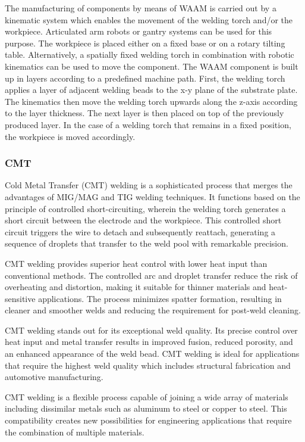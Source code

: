 The manufacturing of components by means of WAAM is carried out by a kinematic system which enables the movement of the welding torch and/or the workpiece. Articulated arm robots or gantry systems can be used for this purpose. The workpiece is placed either on a fixed base or on a rotary tilting table. Alternatively, a spatially fixed welding torch in combination with robotic kinematics can be used to move the component. The WAAM component is built up in layers according to a predefined machine path. First, the welding torch applies a layer of adjacent welding beads to the x-y plane of the substrate plate. The kinematics then move the welding torch upwards along the z-axis according to the layer thickness. The next layer is then placed on top of the previously produced layer. In the case of a welding torch that remains in a fixed position, the workpiece is moved accordingly.

\subsubsection{CMT}
Cold Metal Transfer (CMT) welding is a sophisticated process that merges the advantages of MIG/MAG and TIG welding techniques. It functions based on the principle of controlled short-circuiting, wherein the welding torch generates a short circuit between the electrode and the workpiece. This controlled short circuit triggers the wire to detach and subsequently reattach, generating a sequence of droplets that transfer to the weld pool with remarkable precision.

CMT welding provides superior heat control with lower heat input than conventional methods. The controlled arc and droplet transfer reduce the risk of overheating and distortion, making it suitable for thinner materials and heat-sensitive applications. The process minimizes spatter formation, resulting in cleaner and smoother welds and reducing the requirement for post-weld cleaning.

CMT welding stands out for its exceptional weld quality. Its precise control over heat input and metal transfer results in improved fusion, reduced porosity, and an enhanced appearance of the weld bead. CMT welding is ideal for applications that require the highest weld quality which includes structural fabrication and automotive manufacturing.

CMT welding is a flexible process capable of joining a wide array of materials including dissimilar metals such as aluminum to steel or copper to steel. This compatibility creates new possibilities for engineering applications that require the combination of multiple materials.

